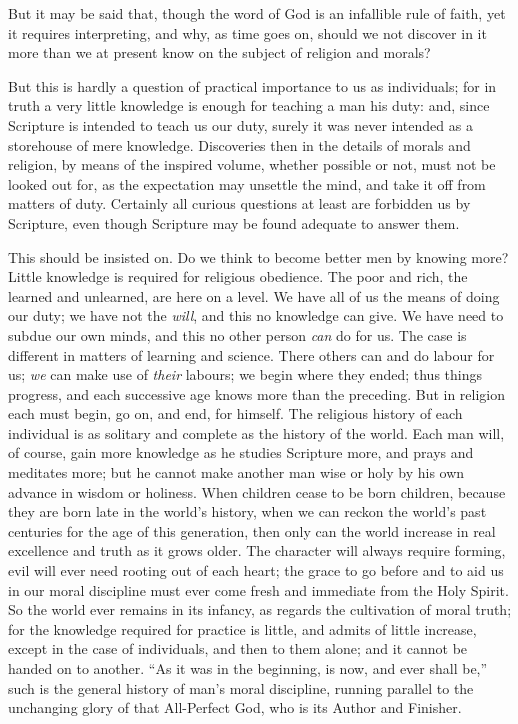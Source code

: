 But it may be said that, though the word of God is an infallible
rule of faith, yet it requires interpreting, and why, as time goes on,
should we not discover in it more than we at present know on the
subject of religion and morals?

But this is hardly a question of practical importance to us as
individuals; for in truth a very little knowledge is enough for
teaching a man his duty: and, since Scripture is intended to teach us
our duty, surely it was never intended as a storehouse of mere
knowledge. Discoveries then in the details of morals and religion, by
means of the inspired volume, whether possible or not, must not be
looked out for, as the expectation may unsettle the mind, and take it
off from matters of duty. Certainly all curious questions at least are
forbidden us by Scripture, even though Scripture may be found adequate
to answer them.

This should be insisted on. Do we think to become better men by
knowing more? Little knowledge is required for religious obedience.
The poor and rich, the learned and unlearned, are here on a level. We
have all of us the means of doing our duty; we have not the \emph{will},
and this no knowledge can give. We have need to subdue our own minds,
and this no other person \emph{can} do for us. The case is different
in matters of learning and science. There others can and do labour for
us; \emph{we} can make use of \emph{their} labours; we begin where
they ended; thus things progress, and each successive age knows more
than the preceding. But in religion each must begin, go on, and end,
for himself. The religious history of each individual is as solitary
and complete as the history of the world. Each man will, of course,
gain more knowledge as he studies Scripture more, and prays and
meditates more; but he cannot make another man wise or holy by his own
advance in wisdom or holiness. When children cease to be born
children, because they are born late in the world's history, when we
can reckon the world's past centuries for the age of this generation,
then only can the world increase in real excellence and truth as it
grows older. The character will always require forming, evil will ever
need rooting out of each heart; the grace to go before and to aid us
in our moral discipline must ever come fresh and immediate from the
Holy Spirit. So the world ever remains in its infancy, as regards the
cultivation of moral truth; for the knowledge required for practice is
little, and admits of little increase, except in the case of
individuals, and then to them alone; and it cannot be handed on to
another. ``As it was in the beginning, is now, and ever shall
be,'' such is the general history of man's moral discipline,
running parallel to the unchanging glory of that All-Perfect God, who
is its Author and Finisher.

